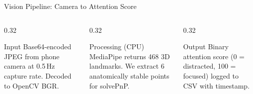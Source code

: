 \documentclass[aspectratio=169,10pt]{beamer}
\begin{document}
\begin{frame}{Vision Pipeline: Camera to Attention Score}
\vspace{8pt}
\begin{columns}[T]
\begin{column}{0.32\textwidth}
\begin{block}{\scriptsize Input}
\scriptsize Base64-encoded JPEG from phone camera at 0.5\,Hz capture rate. Decoded to OpenCV BGR.
\end{block}
\end{column}
\begin{column}{0.32\textwidth}
\begin{block}{\scriptsize Processing (CPU)}
\scriptsize MediaPipe returns 468 3D landmarks. We extract 6 anatomically stable points for solvePnP.
\end{block}
\end{column}
\begin{column}{0.32\textwidth}
\begin{block}{\scriptsize Output}
\scriptsize Binary attention score (0 = distracted, 100 = focused) logged to CSV with timestamp.
\end{block}
\end{column}
\end{columns}
\end{frame}
\end{document}
